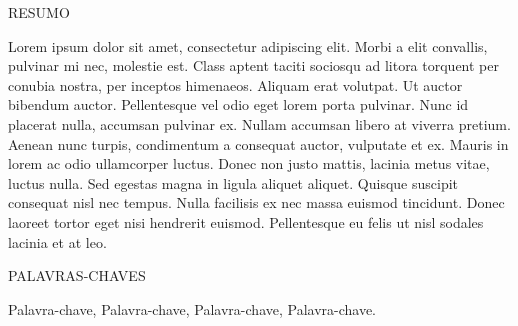 \newpage
\thispagestyle{empty}
\begin{center}
    \uppercase{Resumo}
\end{center}

Lorem ipsum dolor sit amet, consectetur adipiscing elit. Morbi a elit convallis, pulvinar mi nec, molestie est. Class aptent taciti sociosqu ad litora torquent per conubia nostra, per inceptos himenaeos. Aliquam erat volutpat. Ut auctor bibendum auctor. Pellentesque vel odio eget lorem porta pulvinar. Nunc id placerat nulla, accumsan pulvinar ex. Nullam accumsan libero at viverra pretium. Aenean nunc turpis, condimentum a consequat auctor, vulputate et ex. Mauris in lorem ac odio ullamcorper luctus. Donec non justo mattis, lacinia metus vitae, luctus nulla. Sed egestas magna in ligula aliquet aliquet. Quisque suscipit consequat nisl nec tempus. Nulla facilisis ex nec massa euismod tincidunt. Donec laoreet tortor eget nisi hendrerit euismod. Pellentesque eu felis ut nisl sodales lacinia et at leo.

\begin{center}
    \uppercase{Palavras-chaves}
\end{center}

Palavra-chave, Palavra-chave, Palavra-chave, Palavra-chave.